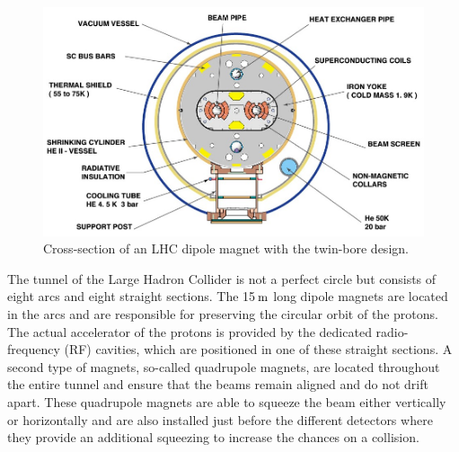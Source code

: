 \begin{figure}[h!t]
 \centering
 \includegraphics[width = 0.6 \textwidth]{Chapters/Chapter2_CERN/Figures/lhc-pho-1998-341.jpg}
 \caption{Cross-section of an LHC dipole magnet with the twin-bore design.}%
 \label{fig::LHCDipole}
\end{figure}

The tunnel of the Large Hadron Collider is not a perfect circle but consists of eight arcs and eight straight sections.
The 15$\, \mathrm{m}$ long dipole magnets are located in the arcs and are responsible for preserving the circular orbit of the protons.
The actual accelerator of the protons is provided by the dedicated radio-frequency (RF) cavities, which are positioned in one of these straight sections.
A second type of magnets, so-called quadrupole magnets, are located throughout the entire tunnel and ensure that the beams remain aligned and do not drift apart. These quadrupole magnets are able to squeeze the beam either vertically or horizontally and are also installed just before the different detectors where they provide an additional squeezing to increase the chances on a collision.

